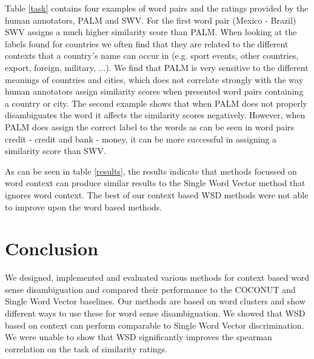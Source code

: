 \documentclass[11pt]{article}
\begin{document}
Table \ref{task} contains four examples of word pairs and the ratings provided by the human annotators, PALM and SWV. For the first word pair (Mexico - Brazil) SWV assigns a much higher similarity score than PALM. When looking at the labels found for countries we often find that they are related to the different contexts that a country's name can occur in (e.g. sport events, other countries, export, foreign, military, $\dots$). We find that PALM is very sensitive to the different meanings of countries and cities, which does not correlate strongly with the way human annotators assign similarity scores when presented word pairs containing a country or city. The second example shows that when PALM does not properly disambiguates the word it affects the similarity scores negatively. However, when PALM does assign the correct label to the words as can be seen in word pairs credit - credit and bank - money, it can be more successful in assigning a similarity score than SWV.

As can be seen in table \ref{results}, the results indicate that methods focussed on word context can produce similar results to the Single Word Vector method that ignores word context. The best of our context based WSD methods were not able to improve upon the word based methods.


\section{Conclusion}
We designed, implemented and evaluated various methods for context based word sense disambiguation and compared their performance to the COCONUT and Single Word Vector baselines. Our methods are based on word clusters and show different ways to use these for word sense disambiguation. We showed that WSD based on context can perform comparable to Single Word Vector discrimination. We were unable to show that WSD significantly improves the spearman correlation on the task of similarity ratings. 



\end{document}

